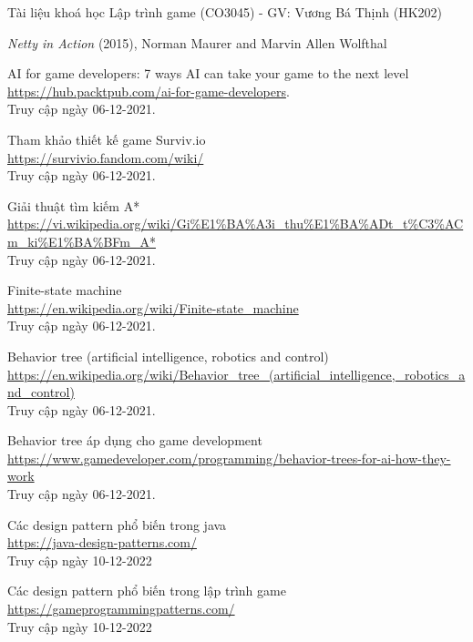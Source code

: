\documentclass[12pt,a4paper]{article}
\begin{document}
  \newpage
  \renewcommand\refname{Tài liệu tham khảo}
  \begin{thebibliography}{80}

    Tài liệu khoá học Lập trình game (CO3045) - GV: Vương Bá Thịnh (HK202)

    \emph{Netty in Action} (2015), Norman Maurer and Marvin Allen Wolfthal
    
    AI for game developers: 7 ways AI can take your game to the next level\\
    \url{https://hub.packtpub.com/ai-for-game-developers}.\\
    Truy cập ngày 06-12-2021.
    
    Tham khảo thiết kế game Surviv.io\\
    \url{https://survivio.fandom.com/wiki/}\\
    Truy cập ngày 06-12-2021.

    Giải thuật tìm kiếm A*\\
    \url{https://vi.wikipedia.org/wiki/Gi%E1%BA%A3i_thu%E1%BA%ADt_t%C3%ACm_ki%E1%BA%BFm_A*}\\
    Truy cập ngày 06-12-2021.
    
    Finite-state machine\\ \url{https://en.wikipedia.org/wiki/Finite-state_machine}\\
    Truy cập ngày 06-12-2021.

    Behavior tree (artificial intelligence, robotics and control)\\
    \url{https://en.wikipedia.org/wiki/Behavior_tree_(artificial_intelligence,_robotics_and_control)}\\
    Truy cập ngày 06-12-2021.

    Behavior tree áp dụng cho game development\\
    \url{https://www.gamedeveloper.com/programming/behavior-trees-for-ai-how-they-work}\\
    Truy cập ngày 06-12-2021.

    Các design pattern phổ biến trong java\\
    \url{https://java-design-patterns.com/}\\
    Truy cập ngày 10-12-2022

    Các design pattern phổ biến trong lập trình game\\
    \url{https://gameprogrammingpatterns.com/}\\
    Truy cập ngày 10-12-2022
  \end{thebibliography}
\end{document}
